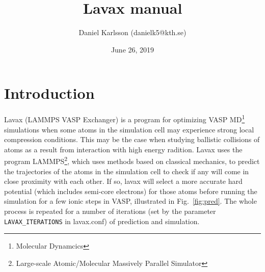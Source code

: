 \documentclass{article}
\title{{\Huge \bfseries Lavax manual}}
\author{Daniel Karlsson (danielk5@kth.se)}
\date{June 26, 2019}
\begin{document}
\maketitle

\tableofcontents



\section{Introduction}
Lavax (LAMMPS VASP Exchanger) is a program for optimizing VASP MD\footnote{Molecular Dynamcics} simulations when some atoms in the simulation cell may experience strong local compression conditions. This may be the case when studying ballistic collisions of atoms as a result from interaction with high energy radition. Lavax uses the program LAMMPS\footnote{Large-scale Atomic/Molecular Massively Parallel Simulator}, which uses methods based on classical mechanics, to predict the trajectories of the atoms in the simulation cell to check if any will come in close proximity with each other. If so, lavax will select a more accurate hard potential (which includes semi-core electrons) for those atoms before running the simulation for a few ionic steps in VASP, illustrated in Fig.~\ref{fig:pred}.
The whole process is repeated for a number of iterations (set by the parameter \texttt{LAVAX\_ITERATIONS} in lavax.conf) of prediction and simulation.
\end{document}
